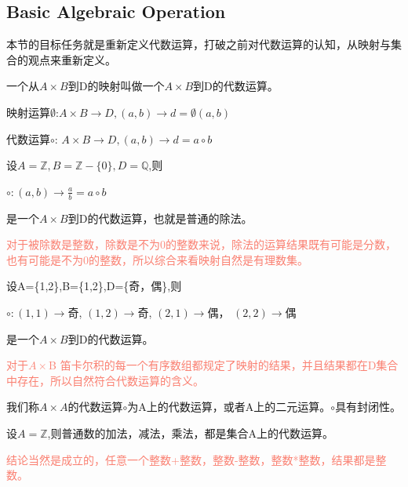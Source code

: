 \documentclass[
	11pt, %
	fleqn, %
	a4paper, %
]{LegrandOrangeBook}
\begin{document}
\subsection{Basic Algebraic Operation}
本节的目标任务就是重新定义代数运算，打破之前对代数运算的认知，从映射与集合的观点来重新定义。

\begin{theorem}
	一个从$A\times B$到D的映射叫做一个$A\times B$到D的代数运算。
\end{theorem}


映射运算$\emptyset$:$A\times B\rightarrow D,(a,b)\rightarrow d=\emptyset(a,b)$ \par
代数运算$\circ$: $A\times B \rightarrow D,(a,b)\rightarrow d=a \circ b$

\begin{example}
	设$A=\mathbb{Z},B=\mathbb{Z}-\{0\},D=\mathbb{Q}$,则
	\begin{center}
		$\circ:(a,b)\rightarrow \frac{a}{b}=a\circ b$
	\end{center}
	是一个$A\times B$到D的代数运算，也就是普通的除法。

	\textcolor{Salmon}{对于被除数是整数，除数是不为0的整数来说，除法的运算结果既有可能是分数，也有可能是不为0的整数，所以综合来看映射自然是有理数集。}

\end{example}

\begin{example}
	设A=\{1,2\},B=\{1,2\},D=\{奇，偶\},则
	\begin{center}
		$\circ:(1,1)\rightarrow$奇,
		$(1,2)\rightarrow$奇,
		$(2,1)\rightarrow$偶，
		$(2,2)\rightarrow$偶
	\end{center}
	是一个$A\times B$到D的代数运算。

	\textcolor{Salmon}{对于$A\times$B 笛卡尔积的每一个有序数组都规定了映射的结果，并且结果都在D集合中存在，所以自然符合代数运算的含义。}
\end{example}

\begin{theorem}
	我们称$A\times A$的代数运算$\circ$为A上的代数运算，或者A上的二元运算。$\circ$具有封闭性。
\end{theorem}

\begin{example}
	设$A=\mathbb{Z}$,则普通数的加法，减法，乘法，都是集合A上的代数运算。

	\textcolor{Salmon}{结论当然是成立的，任意一个整数+整数，整数-整数，整数*整数，结果都是整数。}
\end{example}
\end{document}
